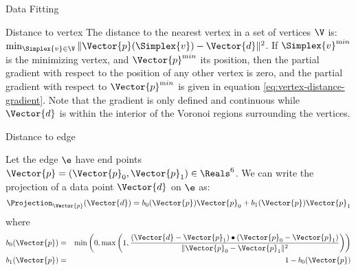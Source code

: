\begin{plSection}{Data Fitting}
\begin{plSection}{Distance to vertex}
The distance to the nearest vertex in a set of vertices $\V$ is:
$\min_{\Simplex{v} \in \V} \| \Vector{p}(\Simplex{v}) - \Vector{d} \|^2$.
If $\Simplex{v}^{\mathrm min}$ is the minimizing vertex,
and
$\Vector{p}^{\mathrm min}$ its position,
then the partial gradient with respect
to the position of any other vertex is zero,
and the partial gradient with respect to $\Vector{p}^{\mathrm min}$
is given in equation \ref{eq:vertex-distance-gradient}.
Note that the gradient is only defined and continuous
while $\Vector{d}$ is within the interior of the
Voronoi regions surrounding the vertices.

\end{plSection}%
\begin{plSection}{Distance to edge}
\label{sec:Distance-to-edge}

Let the edge $\e$ have end points $\Vector{p} = (\Vector{p}_0, \Vector{p}_1) \in \Reals^6$.
We can write the projection of a data point $\Vector{d}$ on $\e$ as:
\begin{equation}
\Projection_\Vector{p} (\Vector{d}) = b_0(\Vector{p}) \Vector{p}_0 + b_1(\Vector{p}) \Vector{p}_1
\end{equation}
where
\begin{eqnarray}
b_0(\Vector{p}) & = &
\min\left(0,\max\left(1,
{{ (\Vector{d} - \Vector{p}_1) \bullet (\Vector{p}_0 - \Vector{p}_1) }
\over
{ \| \Vector{p}_0 - \Vector{p}_1 \|^2 }
}\right) \right) \\
b_1(\Vector{p}) & = & 1 - b_0(\Vector{p})
\nonumber
\end{eqnarray}


\end{plSection}
\end{plSection}
